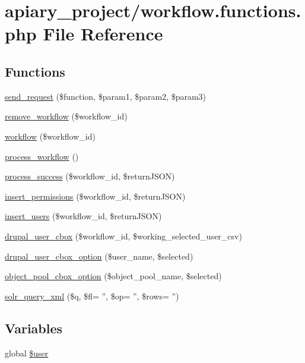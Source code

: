 \hypertarget{workflow_8functions_8php}{
\section{apiary_project/workflow.functions.php File Reference}
\label{workflow_8functions_8php}
}
\subsection*{Functions}
\begin{DoxyCompactItemize}
\item 
\hyperlink{workflow_8functions_8php_a78bd2c85ad1dcdc1fb68e40605d593b0}{send\_\-request} (\$function, \$param1, \$param2, \$param3)
\item 
\hyperlink{workflow_8functions_8php_a8ad99e8c7e97c535f83e28e21d78676c}{remove\_\-workflow} (\$workflow\_\-id)
\item 
\hyperlink{workflow_8functions_8php_ae14d5e0ee58a96811fec24ddef6804ef}{workflow} (\$workflow\_\-id)
\item 
\hyperlink{workflow_8functions_8php_a35a6c169715d6e28cd5117dd8d167094}{process\_\-workflow} ()
\item 
\hyperlink{workflow_8functions_8php_a412560f9041557abc8fd2b5b9f7ac4d8}{process\_\-success} (\$workflow\_\-id, \$returnJSON)
\item 
\hyperlink{workflow_8functions_8php_ada0693a0ae920b6a95d5f5b84f153e84}{insert\_\-permissions} (\$workflow\_\-id, \$returnJSON)
\item 
\hyperlink{workflow_8functions_8php_a9a63e6239c01d9c01fc82f38324afd21}{insert\_\-users} (\$workflow\_\-id, \$returnJSON)
\item 
\hyperlink{workflow_8functions_8php_a4189b45f7deb8243fe7a17d35f004ab3}{drupal\_\-user\_\-cbox} (\$workflow\_\-id, \$working\_\-selected\_\-user\_\-csv)
\item 
\hyperlink{workflow_8functions_8php_a7a5d2f34ccc636dbac03a4f428efacad}{drupal\_\-user\_\-cbox\_\-option} (\$user\_\-name, \$selected)
\item 
\hyperlink{workflow_8functions_8php_a9506fdd370aef346d27fcea8b4bfb54d}{object\_\-pool\_\-cbox\_\-option} (\$object\_\-pool\_\-name, \$selected)
\item 
\hyperlink{workflow_8functions_8php_ae6356bbdc7e39f2f56be2e74848e4c58}{solr\_\-query\_\-xml} (\$q, \$fl= '', \$op= '', \$rows= '')
\end{DoxyCompactItemize}
\subsection*{Variables}
\begin{DoxyCompactItemize}
\item 
global \hyperlink{workflow_8functions_8php_a00365e6c5f70c43fb2ed86c9bc5626e0}{\$user}
\end{DoxyCompactItemize}


